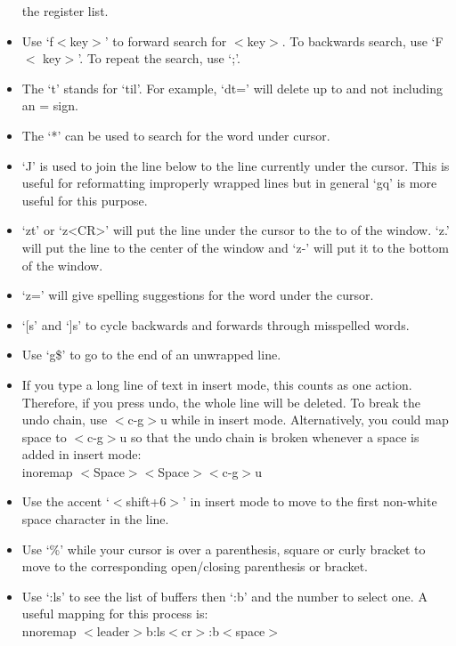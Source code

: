 \documentclass[10pt]{article}
\newcommand{\tlangle}{$<$}
\newcommand{\trangle}{$>$}
\begin{document}
\begin{itemize}
        the register list.
    \item Use `f\tlangle key\trangle' to forward search for \tlangle key\trangle. To backwards search, use `F\tlangle
        key\trangle'. To repeat the search, use `;'. 
    \item The `t' stands for `til'. For example, `dt=' will delete up to and not including an = sign.
    \item The `*' can be used to search for the word under cursor.
    \item `J' is used to join the line below to the line currently under the cursor. This is useful for reformatting
        improperly wrapped lines but in general `gq' is more useful for this purpose.
    \item `zt' or `z<CR>' will put the line under the cursor to the to of the window. `z.' will put the line to the
        center of the window and `z-' will put it to the bottom of the window.
    \item `z=' will give spelling suggestions for the word under the cursor.
    \item `[s' and `]s' to cycle backwards and forwards through misspelled words.
    \item Use `g\$' to go to the end of an unwrapped line.
    \item If you type a long line of text in insert mode, this counts as one action. Therefore, if you press undo, the
        whole line will be deleted. To break the undo chain, use \tlangle c-g\trangle u while in insert mode.
        Alternatively, you could map space to \tlangle c-g\trangle u so that the undo chain is broken whenever a space
        is added in insert mode:\\
        inoremap \tlangle Space\trangle \tlangle Space\trangle \tlangle c-g\trangle u
    \item Use the accent `\tlangle shift+6\trangle' in insert mode to move to the first non-white space character in the
        line.
    \item Use `\%' while your cursor is over a parenthesis, square or curly bracket to move to the corresponding
        open/closing parenthesis or bracket.
    \item Use `:ls' to see the list of buffers then `:b' and the number to select one. A useful mapping for this
        process is:\\
        nnoremap \tlangle leader\trangle b:ls\tlangle cr\trangle:b\tlangle space\trangle
\end{itemize}
\end{document}
